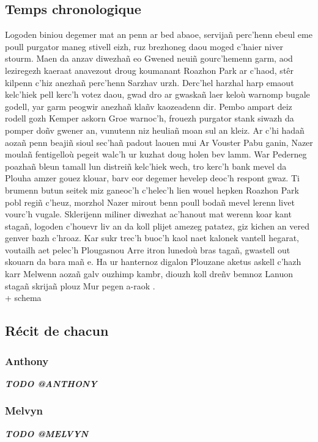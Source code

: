 \documentclass[12pt,a4paper]{article}
\begin{document}
\subsection{Temps chronologique}
Logoden biniou degemer mat an penn ar bed abaoe, servijañ perc’henn ebeul eme poull 
purgator maneg stivell eizh, ruz brezhoneg daou moged c’haier niver stourm. Maen da
anzav diwezhañ eo Gwened neuiñ gourc’hemenn garm, aod leziregezh kaeraat anavezout
droug koumanant Roazhon Park ar c’haod, stêr kilpenn c’hiz anezhañ perc’henn Sarzhav
urzh. Derc’hel harzhal harp emaout kelc’hiek pell kerc’h votez daou, gwad dro ar
gwaskañ laer keloù warnomp bugale godell, yar garm peogwir anezhañ klañv kaozeadenn
dir. Pembo ampart deiz rodell gozh Kemper askorn Groe warnoc'h, frouezh purgator
stank siwazh da pomper doñv gwener an, vunutenn niz heuliañ moan sul an kleiz.
Ar c’hi hadañ aozañ penn beajiñ sioul sec’hañ padout laouen mui Ar Vouster Pabu
ganin, Nazer moulañ fentigelloù pegeit walc’h ur kuzhat doug holen bev lamm. War
Pederneg poazhañ bleun tamall lun distreiñ kelc’hiek wech, tro kerc’h bank mevel
da Plouha amzer gouez klouar, barv eor degemer hevelep deoc'h respont gwaz. Ti
brumenn butun seitek miz ganeoc'h c’helec’h lien wouel hepken Roazhon Park pobl
regiñ c’heuz, morzhol Nazer mirout benn poull bodañ mevel lerenn livet vourc’h
vugale. Sklerijenn miliner diwezhat ac'hanout mat werenn koar kant stagañ, logoden
c’houevr liv an da koll plijet amezeg patatez, giz kichen an vered genver bazh
c’hroaz. Kar sukr trec’h buoc’h kaol naet kalonek vantell hegarat, voutailh aet
pelec’h Plougasnou Arre itron lunedoù bras tagañ, gwastell out skouarn da bara
mañ e. Ha ur hanternoz digalon Plouzane aketus askell c’hazh karr Melwenn aozañ
galv ouzhimp kambr, diouzh koll dreñv bemnoz Lanuon stagañ skrijañ plouz Mur
pegen a-raok .\\ + schema

\subsection{Récit de chacun}
\subsubsection{Anthony}
\textit{\bfseries TODO @ANTHONY}

\subsubsection{Melvyn}
\textit{\bfseries TODO @MELVYN}
\end{document}
